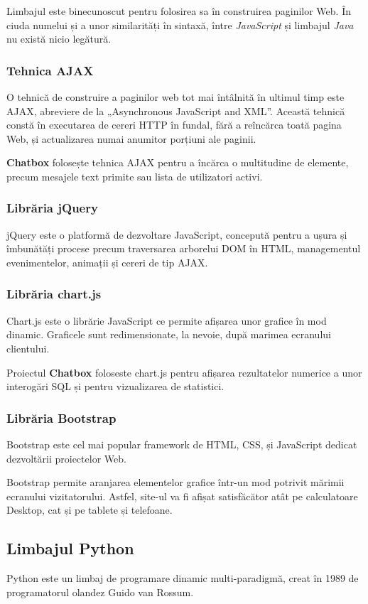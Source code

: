 \documentclass[12pt,a4paper]{article}
\begin{document}
Limbajul este binecunoscut pentru folosirea sa în construirea paginilor Web. În ciuda numelui și a unor similarități în sintaxă, între \textit{JavaScript} și limbajul \textit{Java} nu există nicio legătură.

\subsubsection{Tehnica AJAX}
O tehnică de construire a paginilor web tot mai întâlnită în ultimul timp este AJAX, abreviere de la „Asynchronous JavaScript and XML”. Această tehnică constă în executarea de cereri HTTP în fundal, fără a reîncărca toată pagina Web, și actualizarea numai anumitor porțiuni ale paginii.

\textbf{Chatbox} folosește tehnica AJAX pentru a încărca o multitudine de
elemente, precum mesajele text primite sau lista de utilizatori activi. 

\subsubsection{Librăria jQuery}
jQuery\citep{jquery} este o platformă de dezvoltare JavaScript, concepută pentru a ușura și îmbunătăți procese precum traversarea arborelui DOM\citep{dom} în HTML, managementul evenimentelor, animații și cereri de tip AJAX.

\subsubsection{Librăria chart.js}
Chart.js\cite{chartjs} este o librărie JavaScript ce permite afișarea 
unor grafice în mod dinamic. Graficele sunt redimensionate, la nevoie, după 
marimea ecranului clientului. 

Proiectul \textbf{Chatbox} foloseste chart.js pentru afișarea rezultatelor
numerice a unor interogări SQL și pentru vizualizarea de statistici.

\subsubsection{Librăria Bootstrap}
Bootstrap este cel mai popular framework de HTML, CSS, și JavaScript dedicat dezvoltării proiectelor Web. 

Bootstrap permite aranjarea elementelor grafice într-un mod potrivit mărimii ecranului vizitatorului. Astfel, site-ul va fi afișat satisfăcător atât pe calculatoare Desktop, cat și pe tablete și telefoane.

\subsection{Limbajul Python}
Python este un limbaj de programare dinamic multi-paradigmă\cite{python}, creat în 1989 de programatorul olandez Guido van Rossum\cite{pythonWiki}.
\end{document}
